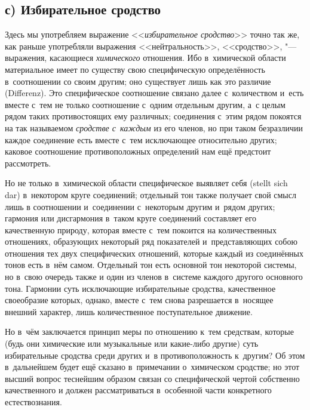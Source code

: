 \subsection[с) Избирательное сродство]{с) Избирательное сродство}

Здесь мы употребляем выражение <<{\em избирательное сродство}>> точно так же,
как раньше употребляли выражения <<нейтральность>>, <<сродство>>, "---
выражения, касающиеся {\em химического} отношения. Ибо в~химической области
материальное имеет по существу свою специфическую определённость в~соотношении
со своим другим; оно существует лишь как это различие (Diffe\-renz). Это
специфическое соотношение связано далее с~количеством и~есть вместе с~тем не
только соотношение с~одним отдельным другим, а~с целым рядом таких
противостоящих ему различных; соединения с~этим рядом покоятся на так
называемом {\em сродстве с~каждым} из его членов, но при таком безразличии
каждое соединение есть вместе с~тем исключающее относительно других; каковое
соотношение противоположных определений нам ещё предстоит рассмотреть.

Но не только в~химической области специфическое выявляет себя (stellt sich dar)
в~некотором круге соединений; отдельный тон также получает свой смысл лишь в
соотношении и~соединении с~некоторым другим и~рядом других; гармония или
дисгармония в~таком круге соединений составляет его качественную природу,
которая вместе с~тем покоится на количественных отношениях, образующих
некоторый ряд показателей и~представляющих собою отношения тех двух
специфических отношений, которые каждый из соединённых тонов есть в~нём самом.
Отдельный тон есть основной тон некоторой системы, но в~свою очередь также и
один из членов в~системе каждого другого основного тона. Гармонии суть
исключающие избирательные сродства, качественное своеобразие которых, однако,
вместе с~тем снова разрешается в~носящее внешний характер, лишь количественное
поступательное движение.

Но в~чём заключается принцип меры по отношению к~тем средствам, которые (будь
они химические или музыкальные или какие-либо другие) суть избирательные
сродства среди других и~в противоположность к~другим? Об этом в~дальнейшем
будет ещё сказано в~примечании о~химическом сродстве; но этот высший вопрос
теснейшим образом связан со специфической чертой собственно качественного и
должен рассматриваться в~особенной части конкретного естествознания.

